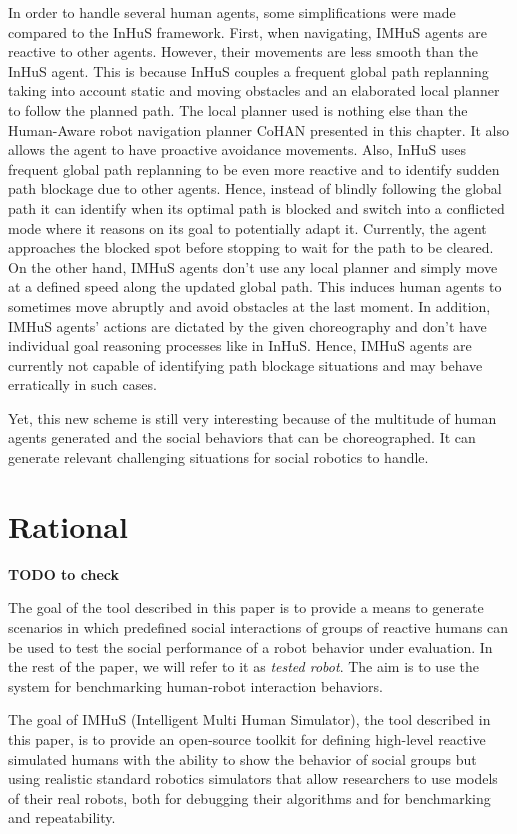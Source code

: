 In order to handle several human agents, some simplifications were made compared to the InHuS framework. First, when navigating, IMHuS agents are reactive to other agents. However, their movements are less smooth than the InHuS agent. This is because InHuS couples a frequent global path replanning taking into account static and moving obstacles and an elaborated local planner to follow the planned path. The local planner used is nothing else than the Human-Aware robot navigation planner CoHAN presented in this chapter. It also allows the agent to have proactive avoidance movements. Also, InHuS uses frequent global path replanning to be even more reactive and to identify sudden path blockage due to other agents. Hence, instead of blindly following the global path it can identify when its optimal path is blocked and switch into a conflicted mode where it reasons on its goal to potentially adapt it. Currently, the agent approaches the blocked spot before stopping to wait for the path to be cleared. 
On the other hand, IMHuS agents don't use any local planner and simply move at a defined speed along the updated global path. This induces human agents to sometimes move abruptly and avoid obstacles at the last moment. 
In addition, IMHuS agents' actions are dictated by the given choreography and don't have individual goal reasoning processes like in InHuS. Hence, IMHuS agents are currently not capable of identifying path blockage situations and may behave erratically in such cases.  

Yet, this new scheme is still very interesting because of the multitude of human agents generated and the social behaviors that can be choreographed. It can generate relevant challenging situations for social robotics to handle.


\section{Rational}

\textbf{TODO to check}

The goal of the tool described in this paper is to provide a means to generate scenarios in which predefined social interactions of groups of reactive humans can be used to test the social performance of a robot behavior under evaluation. In the rest of the paper, we will refer to it as \textit{tested robot}. The aim is to use the system for benchmarking human-robot interaction behaviors.

The goal of IMHuS (Intelligent Multi Human Simulator), the tool described in this paper, is to provide an open-source toolkit for defining high-level reactive simulated humans with the ability to show the behavior of social groups but using realistic standard robotics simulators that allow researchers to use models of their real robots, both for debugging their algorithms and for benchmarking and repeatability.


